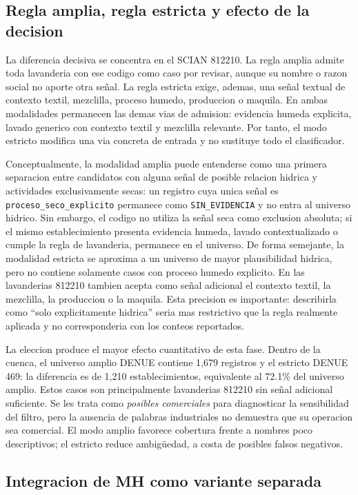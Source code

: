 \documentclass[11pt,letterpaper]{article}
\begin{document}
\subsection{Regla amplia, regla estricta y efecto de la decision}

La diferencia decisiva se concentra en el SCIAN 812210. La regla amplia admite toda lavanderia con ese codigo como caso por revisar, aunque su nombre o razon social no aporte otra señal. La regla estricta exige, ademas, una señal textual de contexto textil, mezclilla, proceso humedo, produccion o maquila. En ambas modalidades permanecen las demas vias de admision: evidencia humeda explicita, lavado generico con contexto textil y mezclilla relevante. Por tanto, el modo estricto modifica una via concreta de entrada y no sustituye todo el clasificador.

Conceptualmente, la modalidad amplia puede entenderse como una primera separacion entre candidatos con alguna señal de posible relacion hidrica y actividades exclusivamente secas: un registro cuya unica señal es \texttt{proceso\_seco\_explicito} permanece como \texttt{SIN\_EVIDENCIA} y no entra al universo hidrico. Sin embargo, el codigo no utiliza la señal seca como exclusion absoluta; si el mismo establecimiento presenta evidencia humeda, lavado contextualizado o cumple la regla de lavanderia, permanece en el universo. De forma semejante, la modalidad estricta se aproxima a un universo de mayor plausibilidad hidrica, pero no contiene solamente casos con proceso humedo explicito. En las lavanderias 812210 tambien acepta como señal adicional el contexto textil, la mezclilla, la produccion o la maquila. Esta precision es importante: describirla como ``solo explicitamente hidrica'' seria mas restrictivo que la regla realmente aplicada y no corresponderia con los conteos reportados.

La eleccion produce el mayor efecto cuantitativo de esta fase. Dentro de la cuenca, el universo amplio DENUE contiene 1,679 registros y el estricto DENUE 469: la diferencia es de 1,210 establecimientos, equivalente al 72.1\% del universo amplio. Estos casos son principalmente lavanderias 812210 sin señal adicional suficiente. Se les trata como \emph{posibles comerciales} para diagnosticar la sensibilidad del filtro, pero la ausencia de palabras industriales no demuestra que su operacion sea comercial. El modo amplio favorece cobertura frente a nombres poco descriptivos; el estricto reduce ambigüedad, a costa de posibles falsos negativos.

\subsection{Integracion de MH como variante separada}
\end{document}

